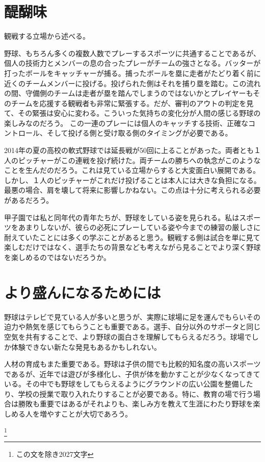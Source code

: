 \documentclass[10.5pt]{jarticle}
\begin{document}
\newpage
\section{醍醐味}
観戦する立場から述べる。


野球、もちろん多くの複数人数でプレーするスポーツに共通することであるが、個人の技術力とメンバーの息の合ったプレーがチームの強さとなる。バッターが打ったボールをキャッチャーが捕る。捕ったボールを塁に走者がたどり着く前に近くのチームメンバーに投げる。投げられた側はそれを捕り塁を踏む。この流れの間、守備側のチームは走者が塁を踏んでしまうのではないかとプレイヤーもそのチームを応援する観戦者も非常に緊張する。だが、審判のアウトの判定を見て、その緊張は安心に変わる。こういった気持ちの変化分が人間の感じる野球の楽しみなのだろう。
この一連のプレーには個人のキャッチする技術、正確なコントロール、そして投げる側と受け取る側のタイミングが必要である。

2014年の夏の高校の軟式野球では延長戦が50回に上ることがあった。両者とも１人のピッチャーがこの連戦を投げ続けた。両チームの勝ちへの執念がこのようなことを生んだのだろう。これは見ている立場からすると大変面白い展開である。しかし、１人のピッチャーがこれだけ投げることは本人には大きな負担になる。最悪の場合、肩を壊して将来に影響しかねない。この点は十分に考えられる必要があるだろう。

甲子園では私と同年代の青年たちが、野球をしている姿を見られる。私はスポーツをあまりしないが、彼らの必死にプレーしている姿や今までの練習の厳しさに耐えていたことには多くの学ぶことがあると思う。観戦する側は試合を単に見て楽しむだけではなく、選手たちの背景なども考えながら見ることでより深く野球を楽しめるのではないだろうか。

\section{より盛んになるためには}
野球はテレビで見ている人が多いと思うが、実際に球場に足を運んでもらいその迫力や熱気を感じてもらうことも重要である。選手、自分以外のサポータと同じ空気を共有することで、より野球の面白さを理解してもらえるだろう。球場でしか体験できない新たな発見もあるかもしれない。

人材の育成もまた重要である。野球は子供の間でも比較的知名度の高いスポーツであるが、近年では遊びが多様化し、子供が体を動かすことが少なくなってきている。その中でも野球をしてもらえるようにグラウンドの広い公園を整備したり、学校の授業で取り入れたりすることが必要である。特に、教育の場で行う場合は勝敗も重要ではあるがそれよりも、楽しみ方を教えて生涯にわたり野球を楽しめる人を増やすことが大切であろう。

\renewcommand{\thefootnote}{\fnsymbol{footnote}}
\footnote[0]{この文を除き2027文字}
\end{document}
